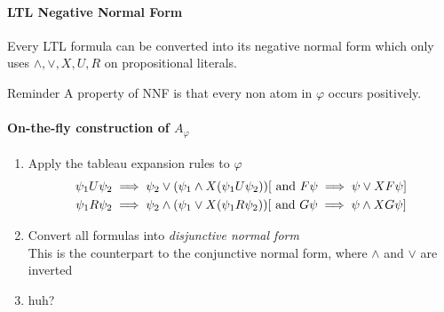 \documentclass{article}
\begin{document}
\paragraph{LTL Negative Normal Form}
Every LTL formula can be converted into its negative normal form which only uses $\wedge,\vee,X,U,R$ on propositional literals.

\begin{callout}{Reminder}
    A property of NNF is that every non atom in $\varphi$ occurs positively.
\end{callout}

\paragraph{On-the-fly construction of $A_\varphi$}
\begin{enumerate}
    \item Apply the tableau expansion rules to $\varphi$
        \begin{gather*}
            \psi_1 U \psi_2 \implies \psi_2 \vee (\psi_1\wedge X(\psi_1 U \psi_2)) [\text{ and } F\psi\implies\psi \vee XF\psi] \\
            \psi_1 R \psi_2 \implies \psi_2 \wedge (\psi_1\vee X(\psi_1 R \psi_2)) [\text{ and } G\psi\implies\psi \wedge XG\psi] 
        \end{gather*}
    \item Convert all formulas into \textit{disjunctive normal form}\\
        This is the counterpart to the conjunctive normal form, where $\wedge$ and $\vee$ are inverted
    \item huh?
\end{enumerate}
\end{document}
